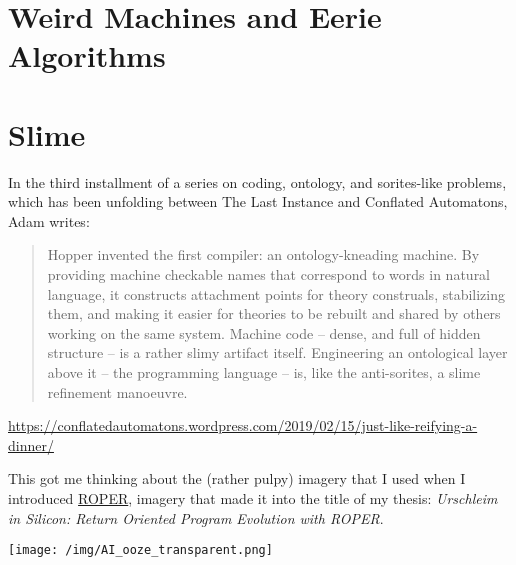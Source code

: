 \documentclass[11pt]{article}
\date{\today}
\title{}
\begin{document}
\tableofcontents

\section{Weird Machines and Eerie Algorithms}
\label{sec:org4bb19ce}
\section{Slime}
\label{sec:org36ab4c0}

In the third installment of a series on coding, ontology, and sorites-like
problems, which has been unfolding between The Last Instance and
Conflated Automatons, Adam writes:

\begin{quote}
Hopper invented the first compiler: an ontology-kneading machine. By providing
machine checkable names that correspond to words in natural language, it
constructs attachment points for theory construals, stabilizing them, and making
it easier for theories to be rebuilt and shared by others working on the same
system. Machine code – dense, and full of hidden structure – is a rather slimy
artifact itself. Engineering an ontological layer above it – the programming
language – is, like the anti-sorites, a slime refinement manoeuvre.
\end{quote}

\url{https://conflatedautomatons.wordpress.com/2019/02/15/just-like-reifying-a-dinner/}

This got me thinking about the (rather pulpy) imagery that I used when
I introduced \href{http://roper.eschtronics.ca}{ROPER}, imagery that made it into the title of my thesis:
\emph{Urschleim in Silicon: Return Oriented Program Evolution with ROPER}.

\begin{center}
\texttt{[image: /img/AI\_ooze\_transparent.png]}
\end{center}
\end{document}
